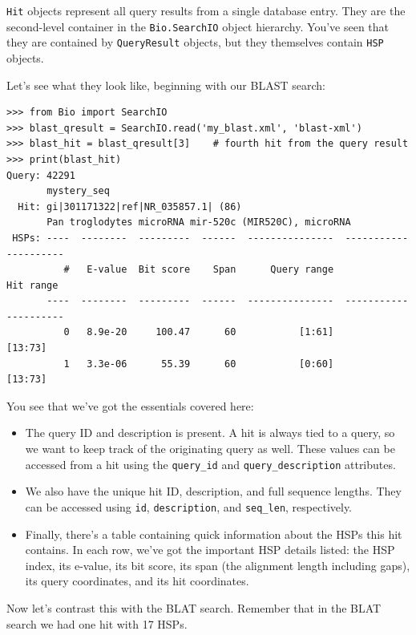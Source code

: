 \documentclass{report}
\begin{document}
\verb|Hit| objects represent all query results from a single database entry.
They are the second-level container in the \verb|Bio.SearchIO| object hierarchy.
You've seen that they are contained by \verb|QueryResult| objects, but they
themselves contain \verb|HSP| objects.

Let's see what they look like, beginning with our BLAST search:

\begin{verbatim}
>>> from Bio import SearchIO
>>> blast_qresult = SearchIO.read('my_blast.xml', 'blast-xml')
>>> blast_hit = blast_qresult[3]    # fourth hit from the query result
>>> print(blast_hit)
Query: 42291
       mystery_seq
  Hit: gi|301171322|ref|NR_035857.1| (86)
       Pan troglodytes microRNA mir-520c (MIR520C), microRNA
 HSPs: ----  --------  ---------  ------  ---------------  ---------------------
          #   E-value  Bit score    Span      Query range              Hit range
       ----  --------  ---------  ------  ---------------  ---------------------
          0   8.9e-20     100.47      60           [1:61]                [13:73]
          1   3.3e-06      55.39      60           [0:60]                [13:73]
\end{verbatim}

You see that we've got the essentials covered here:

\begin{itemize}
\item The query ID and description is present. A hit is always tied to a query,
    so we want to keep track of the originating query as well. These values can
    be accessed from a hit using the \verb|query_id| and
    \verb|query_description| attributes.
\item We also have the unique hit ID, description, and full sequence lengths.
    They can be accessed using \verb|id|, \verb|description|, and
    \verb|seq_len|, respectively.
\item Finally, there's a table containing quick information about the HSPs this
    hit contains. In each row, we've got the important HSP details listed: the
    HSP index, its e-value, its bit score, its span (the alignment length
    including gaps), its query coordinates, and its hit coordinates.
\end{itemize}

Now let's contrast this with the BLAT search. Remember that in the BLAT search we
had one hit with 17 HSPs.
\end{document}

